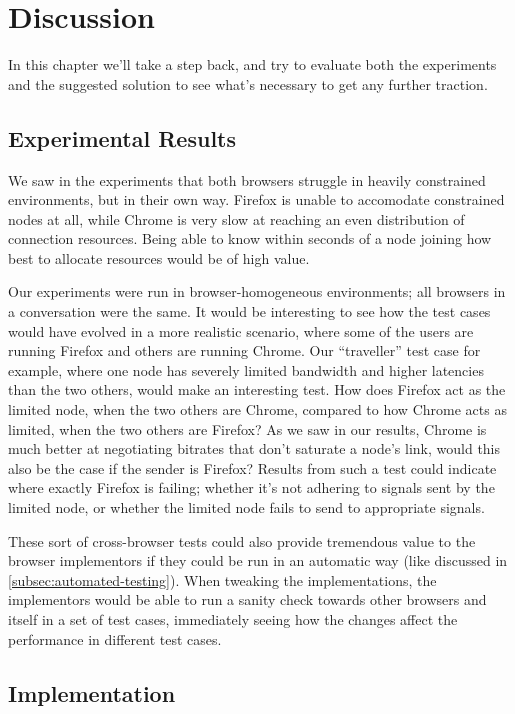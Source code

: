 \chapter{Discussion}
\label{chp:discussion}

In this chapter we'll take a step back, and try to evaluate both the experiments and the suggested solution to see what's necessary to get any further traction.


\section{Experimental Results}

We saw in the experiments that both browsers struggle in heavily constrained environments, but in their own way. Firefox is unable to accomodate constrained nodes at all, while Chrome is very slow at reaching an even distribution of connection resources. Being able to know within seconds of a node joining how best to allocate resources would be of high value.

Our experiments were run in browser-homogeneous environments; all browsers in a conversation were the same. It would be interesting to see how the test cases would have evolved in a more realistic scenario, where some of the users are running Firefox and others are running Chrome. Our ``traveller'' test case for example, where one node has severely limited bandwidth and higher latencies than the two others, would make an interesting test. How does Firefox act as the limited node, when the two others are Chrome, compared to how Chrome acts as limited, when the two others are Firefox? As we saw in our results, Chrome is much better at negotiating bitrates that don't saturate a node's link, would this also be the case if the sender is Firefox? Results from such a test could indicate where exactly Firefox is failing; whether it's not adhering to signals sent by the limited node, or whether the limited node fails to send to appropriate signals.

These sort of cross-browser tests could also provide tremendous value to the browser implementors if they could be run in an automatic way (like discussed in \autoref{subsec:automated-testing}). When tweaking the implementations, the implementors would be able to run a sanity check towards other browsers and itself in a set of test cases, immediately seeing how the changes affect the performance in different test cases.


\section{Implementation}

